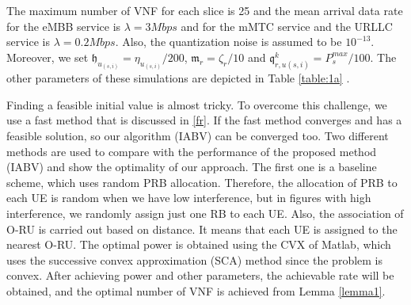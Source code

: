 \documentclass[lettersize,journal]{IEEEtran}
\begin{document}
The maximum number of VNF for each slice is 25 and the mean arrival data rate for the eMBB service is $\lambda  = 3Mbps$ and for the mMTC service and the URLLC  service is $\lambda  = 0.2Mbps$.
Also, the quantization noise is assumed to be $10^{-13}$.
Moreover, we set $\mathfrak{h}_{u_{(s,i)}} = \eta_{u_{(s,i)}}/200$, $\mathfrak{m}_{r} = \zeta_r/10$
and $\mathfrak{q}^k_{r,u(s,i)} = P_{s}^{max}/100$. The other parameters of these simulations are depicted in Table \ref{table:1a} \cite{3GPPTS1, 3GPPTS2,IMT, ETSI1}.%
\begin{table}[H]
 \caption {Simulation Parameters} \label{table:1a}
 \begin{center}
 \end{center}
 \end{table}
Finding a feasible initial value is almost tricky. To overcome this challenge, we use a fast method that is discussed in \ref{fr}. If the fast method converges and has a feasible solution, so our algorithm (IABV) can be converged too.
Two different methods are used to compare with the performance of the proposed method (IABV) and show the optimality of our approach.
The first one is a baseline scheme, which uses random PRB allocation. Therefore, the allocation of PRB to each UE is random when we have low interference, but in figures with high interference, we randomly assign just one RB to each UE. Also, the association of O-RU is carried out based on distance. It means that each UE is assigned to the nearest O-RU. The optimal power is obtained using the CVX of Matlab, which uses the successive convex approximation (SCA) method since the problem is convex.
After achieving power and other parameters, the achievable rate will be obtained, and the optimal number of VNF is achieved from Lemma \eqref{lemma1}.
\end{document}
